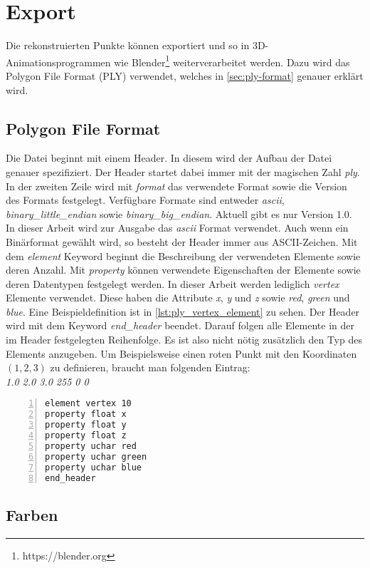 \section{Export}
Die rekonstruierten Punkte können exportiert und so in 3D-Animationsprogrammen wie Blender\footnote{https://blender.org} weiterverarbeitet werden.
Dazu wird das Polygon File Format (PLY) verwendet, welches in \autoref{sec:ply-format} genauer erklärt wird.


\subsection{Polygon File Format}\label{sec:ply-format}
Die Datei beginnt mit einem Header.
In diesem wird der Aufbau der Datei genauer spezifiziert.
Der Header startet dabei immer mit der magischen Zahl \emph{ply}.
In der zweiten Zeile wird mit \emph{format} das verwendete Format sowie die Version des Formats festgelegt.
Verfügbare Formate sind entweder \emph{ascii}, \emph{binary\_little\_endian} sowie \emph{binary\_big\_endian}.
Aktuell gibt es nur Version 1.0.
In dieser Arbeit wird zur Ausgabe das \emph{ascii} Format verwendet.
Auch wenn ein Binärformat gewählt wird, so besteht der Header immer aus ASCII-Zeichen.
Mit dem \emph{element} Keyword beginnt die Beschreibung der verwendeten Elemente sowie deren Anzahl.
Mit \emph{property} können verwendete Eigenschaften der Elemente sowie deren Datentypen festgelegt werden.
In dieser Arbeit werden lediglich \emph{vertex} Elemente verwendet.
Diese haben die Attribute \emph{x}, \emph{y} und \emph{z} sowie \emph{red}, \emph{green} und \emph{blue}.
Eine Beispieldefinition ist in \autoref{lst:ply_vertex_element} zu sehen.
Der Header wird mit dem Keyword \emph{end\_header} beendet.
Darauf folgen alle Elemente in der im Header festgelegten Reihenfolge.
Es ist also nicht nötig zusätzlich den Typ des Elements anzugeben.
Um Beispielsweise einen roten Punkt mit den Koordinaten $\left(1, 2, 3\right)$ zu definieren, braucht man folgenden Eintrag:\\
\emph{1.0	2.0	3.0	255	0	0}

\begin{lstlisting}[numbers=left, breaklines=true, breakatwhitespace=false, label=lst:ply_vertex_element, caption=Beispiel PLY Header für 10 Vertex Elemente mit den Attributen Position und Farbe]
element vertex 10
property float x
property float y
property float z
property uchar red
property uchar green
property uchar blue
end_header
\end{lstlisting}

\subsection{Farben}